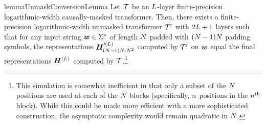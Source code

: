 \begin{restatable}{lemma}{UnmaskConversionLemma}\label{lem:unmask-conversion-fp}
   Let ${{\mathcal{T}}}$ be an ${{L}}$-layer finite-precision logarithmic-width causally-masked transformer. 
   Then, there exists a finite-precision logarithmic-width unmasked transformer ${{\mathcal{T}}}'$ with $2 {{L}} + 1$ layers such that for any input string ${{\boldsymbol{w}}} \in {{{{{{\Sigma}}^{*}}}}}$ of length ${{N}}$ padded with $({{N}} - 1){{N}}$ padding symbols, the representations ${{{{{\bm{H}}}}}}^{\prime({{L}})}_{({{N}} - 1) {{N}} : {{N}}^2}$ computed by ${{\mathcal{T}}}'$ on ${{\boldsymbol{w}}}$ equal the final representations ${{{{{\bm{H}}}}}}^{({{L}})}$ computed by ${{\mathcal{T}}}$.\footnote{This simulation is somewhat inefficient in that only a subset of the ${{N}}$ positions are used at each of the ${{N}}$ blocks (specifically, ${{n}}$ positions in the ${{n}}\textsuperscript{th}$ block). While this could be made more efficient with a more sophisticated construction, the asymptotic complexity would remain quadratic in ${{N}}$.}
\end{restatable}
